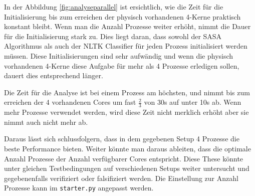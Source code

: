 In der Abbildung \ref{fig:analyseparallel} ist ersichtlich, wie die Zeit für die Initialisierung bis zum erreichen der physisch vorhandenen 4-Kerne praktisch konstant bleibt. Wenn man die Anzahl Prozesse weiter erhöht, nimmt die Dauer für die Initialisierung stark zu. Dies liegt daran, dass sowohl der SASA Algorithmus als auch der NLTK Classifier für jeden Prozess initialisiert werden müssen. Diese Initialisierungen sind sehr aufwändig und wenn die physisch vorhandenen 4-Kerne diese Aufgabe für mehr als 4 Prozesse erledigen sollen, dauert dies entsprechend länger.

Die Zeit für die Analyse ist bei einem Prozess am höchsten, und nimmt bis zum erreichen der 4 vorhandenen Cores um fast $\frac{2}{3}$ von 30s auf unter 10s ab. Wenn mehr Prozesse verwendet werden, wird diese Zeit nicht merklich erhöht aber sie nimmt auch nicht mehr ab.

Daraus lässt sich schlussfolgern, dass in dem gegebenen Setup 4 Prozesse die beste Performance bieten. Weiter könnte man daraus ableiten, dass die optimale Anzahl Prozesse der Anzahl verfügbarer Cores entspricht. Diese These könnte unter gleichen Testbedingungen auf verschiedenen Setups weiter untersucht und gegebenenfalls verifiziert oder falsifiziert werden. Die Einstellung zur Anzahl Prozesse kann im \lstinline$starter.py$ angepasst werden.
